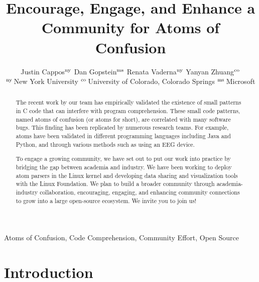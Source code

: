 \documentclass[conference]{IEEEtran}
\begin{document}
\newif\ifrev
\ifrev
  \newcommand{\yanyan}[1]{{\color{blue} [Yanyan: #1]}}
  \newcommand{\red}[1]{\textcolor{red}{#1}}
  \newcommand{\todo}[1]{\textcolor{red}{\textbf{Anyone todo}: #1}}
\else
  \newcommand{\yanyan}[1]{}
  \newcommand{\red}[1]{}
  \newcommand{\todo}[1]{}
\fi

\title{Encourage, Engage, and
Enhance a Community for Atoms of Confusion}

\author{Justin Cappos${}^{\rm ny}$ \qquad Dan Gopstein${}^{\rm ms}$ \qquad Renata Vaderna${}^{\rm ny}$ \qquad Yanyan Zhuang${}^{\rm co}$\\
${}^{\rm ny}$\,New York University \quad 
${}^{\rm co}$\,University of Colorado, Colorado Springs \quad  ${}^{\rm ms}$\,Microsoft %
}

\maketitle

\begin{abstract}
The recent work by our team has empirically 
validated the existence of small patterns in C code
that can interfere with program comprehension.
These small code patterns, named atoms of confusion 
(or atoms for short), are correlated with many software bugs. This finding has been replicated by numerous 
research teams. For example, atoms have been validated in different programming languages including Java and Python, and through various methods such as using an EEG device.

To engage a growing community, we have set out to put our work 
into practice by bridging the gap between academia and 
industry. We have been working to deploy atom parsers in the 
Linux kernel and developing data sharing and visualization 
tools with the Linux Foundation. We plan to build a broader 
community through academia-industry collaboration, 
encouraging, engaging, and enhancing community connections to 
grow into a large open-source ecosystem. We invite you to join 
us!

\end{abstract}

\begin{IEEEkeywords}
Atoms of Confusion, Code Comprehension, Community Effort, Open Source
\end{IEEEkeywords}

\section{Introduction}
\end{document}
